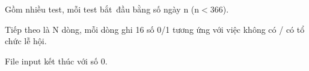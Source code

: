 Gồm nhiều test, mỗi test bắt đầu bằng số ngày n (n$<$366).

Tiếp theo là N dòng, mỗi dòng ghi 16 số 0/1 tương ứng với việc không có / có tổ chức lễ hội.

File input kết thúc với số 0.